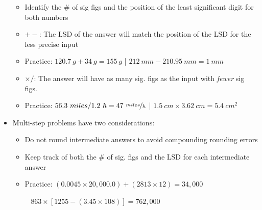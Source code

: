 \documentclass[12pt, openany, letterpaper]{memoir}
\begin{document}
\begin{itemize}
	\begin{itemize}
		\item Identify the \# of sig figs and the position of the least significant digit for both numbers
		\item $+-$: The LSD of the answer will match the position of the LSD for the less precise input
		\item Practice: $120.7~g + 34~g = 155~g$ \hspace{1em}|\hspace{1em} $212~mm - 210.95~mm = 1~mm$
		\item $\times/$: The answer will have as many sig. figs as the input with \emph{fewer} sig figs.
		\item Practice: $56.3~miles / 1.2~h = 47~\nicefrac{miles}{h}$ \hspace{1em}|\hspace{1em} $1.5~cm\times3.62~cm = 5.4~cm^2$
	\end{itemize}
	\item Multi-step problems have two considerations:
	\begin{itemize}
		\item Do not round intermediate answers to avoid compounding rounding errors
		\item Keep track of both the \# of sig. figs and the LSD for each intermediate answer
		\item Practice: $(0.0045\times20,000.0)+(2813\times12)=34,000$
		
		~\hphantom{Practice:} $863\times\left[1255-\left(3.45\times108\right)\right]=762,000$
	\end{itemize}
\end{itemize}
\end{document}
